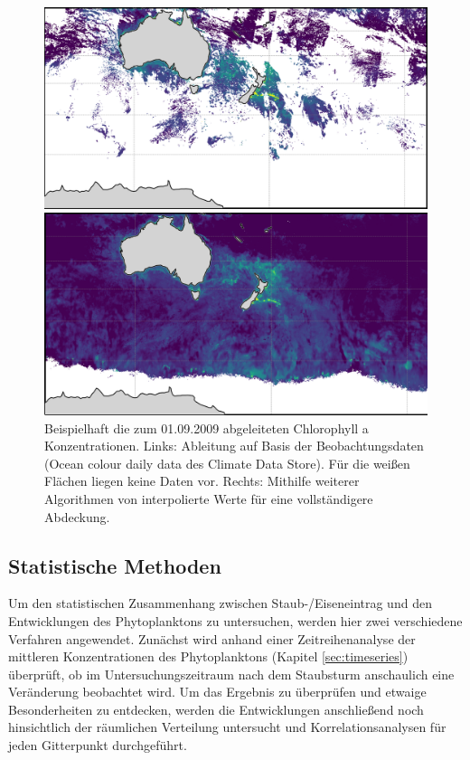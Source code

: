 \documentclass[12pt,a4paper,onecolumn]{scrartcl}
\begin{document}
\begin{figure}[!htb]
	\begin{minipage}[c]{0.49\textwidth}
		\includegraphics[width=\textwidth]{bilder/chla_raw.png}
	\end{minipage}\hfill
	\begin{minipage}[c]{0.49\textwidth}
		 \includegraphics[width=\textwidth]{bilder/chla_interpol.png}
	\end{minipage}\hfill
	\caption{Beispielhaft die zum 01.09.2009 abgeleiteten Chlorophyll a Konzentrationen. Links: Ableitung auf Basis der Beobachtungsdaten (Ocean colour daily data des Climate Data Store). Für die weißen Flächen liegen keine Daten vor. Rechts: Mithilfe weiterer Algorithmen von \citet{Saulquin.2019} interpolierte Werte für eine vollständigere Abdeckung.} \label{fig:chla}
\end{figure}
\subsection{Statistische Methoden} \label{sec:stats}
Um den statistischen Zusammenhang zwischen Staub-/Eiseneintrag und den Entwicklungen des Phytoplanktons zu untersuchen, werden hier zwei verschiedene Verfahren angewendet. Zunächst wird anhand einer Zeitreihenanalyse der mittleren Konzentrationen des Phytoplanktons (Kapitel \ref{sec:timeseries}) überprüft, ob im Untersuchungszeitraum nach dem Staubsturm  anschaulich eine Veränderung beobachtet wird. Um das Ergebnis zu überprüfen und etwaige Besonderheiten zu entdecken, werden die Entwicklungen anschließend noch hinsichtlich der räumlichen Verteilung untersucht und Korrelationsanalysen für jeden Gitterpunkt durchgeführt.
\end{document}
